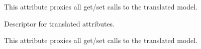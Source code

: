 \documentclass[letterpaper,10pt,english]{sphinxmanual}
\begin{document}
\begin{fulllineitems}
\begin{fulllineitems}
\sphinxAtStartPar
This attribute proxies all get/set calls to the translated model.

\end{fulllineitems}


\begin{fulllineitems}
\label{\detokenize{index:core.models.SwimmingPoolInfo.pool_opening_start}}
\pysigstartsignatures
\pysigline
{}
\pysigstopsignatures
\sphinxAtStartPar
Descriptor for translated attributes.

\sphinxAtStartPar
This attribute proxies all get/set calls to the translated model.

\end{fulllineitems}


\end{fulllineitems}

\end{document}
